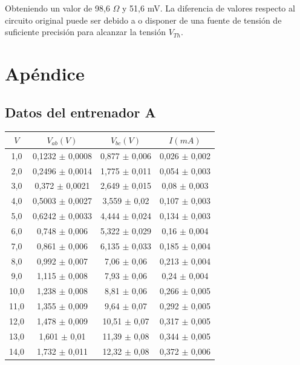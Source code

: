 \documentclass[a4paper,11pt]{article}
\begin{document}
Obteniendo un valor de 98,6 $\Omega$ y 51,6 mV. La diferencia de valores respecto al circuito original puede ser debido a o disponer de una fuente de tensión de suficiente precisión para alcanzar la tensión $V_{Th}$.

\newpage
\section{Apéndice}
\subsection*{Datos del entrenador A}
\begin{tabular}{|c|c|c|c|}
\hline
$V$	&    $V_{ab}(V)$	  &      $V_{bc}(V)$	    &    $I(mA)$ \\
\hline
1,0	   & 	0,1232 $\pm$ 0,0008    &   0,877 $\pm$  0,006	 &   0,026 $\pm$  0,002\\
\hline
2,0	   &		0,2496 $\pm$ 0,0014    &   1,775 $\pm$  0,011	 &   0,054 $\pm$  0,003\\
\hline
3,0	   & 	0,372 $\pm$  0,0021    &   2,649 $\pm$  0,015	 &   0,08  $\pm$  0,003\\
\hline
4,0	   & 	0,5003 $\pm$ 0,0027    &   3,559 $\pm$  0,02	 &   0,107 $\pm$  0,003\\
\hline
5,0	   & 	0,6242 $\pm$ 0,0033    &   4,444 $\pm$  0,024	 &   0,134 $\pm$  0,003\\
\hline
6,0	   & 	0,748 $\pm$  0,006     &   5,322 $\pm$  0,029	 &   0,16  $\pm$  0,004\\
\hline
7,0	   & 	0,861 $\pm$  0,006     &   6,135 $\pm$  0,033	 &   0,185 $\pm$  0,004\\
\hline
8,0	   & 	0,992 $\pm$  0,007     &   7,06 $\pm$   0,06	 &   0,213 $\pm$  0,004\\
\hline
9,0	   & 	1,115 $\pm$  0,008     &   7,93  $\pm$  0,06	 &   0,24  $\pm$  0,004\\
\hline
10,0   & 	1,238 $\pm$  0,008     &   8,81  $\pm$  0,06	 &   0,266 $\pm$  0,005\\
\hline
11,0   & 	1,355 $\pm$  0,009     &   9,64  $\pm$  0,07	 &   0,292 $\pm$  0,005\\
\hline
12,0   & 	1,478 $\pm$  0,009     &   10,51 $\pm$  0,07	 &   0,317 $\pm$  0,005\\
\hline
13,0   & 	1,601 $\pm$  0,01	   &   11,39 $\pm$  0,08	 &   0,344 $\pm$  0,005\\
\hline
14,0   & 	1,732 $\pm$  0,011     &   12,32 $\pm$  0,08	 &   0,372 $\pm$  0,006\\

\end{tabular}
\end{document}
